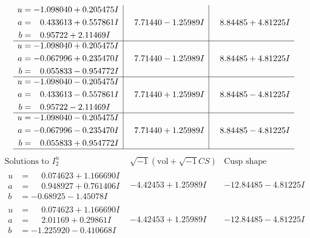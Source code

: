\documentclass[1p]{elsarticle_modified}
\theoremstyle{definition}
\newcommand{\I}{\sqrt{-1}}
\begin{document}
$$\begin{array}{c|c|c}
\begin{aligned}
u &= -1.098040 + 0.205475 I \\
a &= \phantom{-}0.433613 + 0.557861 I \\
b &= \phantom{-}0.95722 + 2.11469 I\end{aligned}
 & \phantom{-}7.71440 - 1.25989 I & \phantom{-}8.84485 + 4.81225 I \\ \hline\begin{aligned}
u &= -1.098040 + 0.205475 I \\
a &= -0.067996 + 0.235470 I \\
b &= \phantom{-}0.055833 - 0.954772 I\end{aligned}
 & \phantom{-}7.71440 - 1.25989 I & \phantom{-}8.84485 + 4.81225 I \\ \hline\begin{aligned}
u &= -1.098040 - 0.205475 I \\
a &= \phantom{-}0.433613 - 0.557861 I \\
b &= \phantom{-}0.95722 - 2.11469 I\end{aligned}
 & \phantom{-}7.71440 + 1.25989 I & \phantom{-}8.84485 - 4.81225 I \\ \hline\begin{aligned}
u &= -1.098040 - 0.205475 I \\
a &= -0.067996 - 0.235470 I \\
b &= \phantom{-}0.055833 + 0.954772 I\end{aligned}
 & \phantom{-}7.71440 + 1.25989 I & \phantom{-}8.84485 - 4.81225 I\\
 \hline 
 \end{array}$$\newpage$$\begin{array}{c|c|c}  
\text{Solutions to }I^u_{2}& \I (\text{vol} + \sqrt{-1}CS) & \text{Cusp shape}\\
 \hline 
\begin{aligned}
u &= \phantom{-}0.074623 + 1.166690 I \\
a &= \phantom{-}0.948927 + 0.761406 I \\
b &= -0.68925 - 1.45078 I\end{aligned}
 & -4.42453 + 1.25989 I & -12.84485 - 4.81225 I \\ \hline\begin{aligned}
u &= \phantom{-}0.074623 + 1.166690 I \\
a &= \phantom{-}2.01169 + 0.29861 I \\
b &= -1.225920 - 0.410668 I\end{aligned}
 & -4.42453 + 1.25989 I & -12.84485 - 4.81225 I \\ \hline\begin{aligned}

\end{aligned}
\end{array}$$
\end{document}
